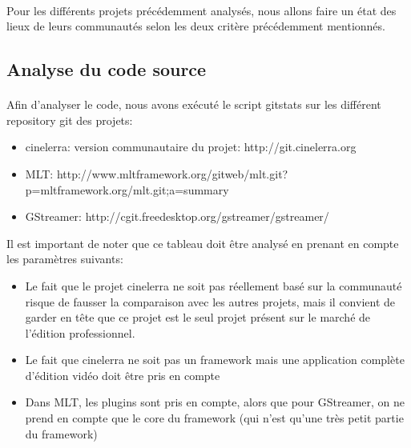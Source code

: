 \paragraph{}

Pour les différents projets précédemment analysés, nous allons
faire un état des lieux de leurs communautés selon les deux critère
précédemment mentionnés.

\subsection {Analyse du code source}

\paragraph{}

Afin d'analyser le code, nous avons exécuté le script gitstats sur
les différent repository git des projets:

\begin{itemize}

  \item {cinelerra: version communautaire du projet:
  http://git.cinelerra.org }

  \item {MLT:
http://www.mltframework.org/gitweb/mlt.git?p=mltframework.org/mlt.git;a=summary}

  \item {GStreamer: http://cgit.freedesktop.org/gstreamer/gstreamer/ }

\end{itemize}

Il est important de noter que ce tableau doit être analysé en prenant
en compte les paramètres suivants:

\begin{itemize}

  \item {Le fait que le projet cinelerra ne soit pas réellement basé
  sur la communauté
    risque de fausser la comparaison avec les autres projets, mais il
    convient de garder en tête que ce projet est le seul projet présent
    sur le marché de l'édition professionnel.}


  \item {Le fait que cinelerra ne soit pas un framework mais une
    application complète d'édition vidéo doit être pris en compte}

  \item {Dans MLT, les plugins sont pris en compte, alors
  que pour GStreamer, on ne prend en compte que le core du framework
  (qui n'est qu'une très petit partie du framework)}

\end{itemize}

